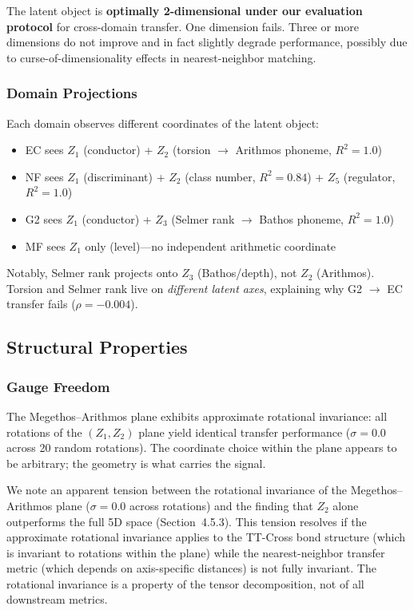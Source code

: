 \documentclass[11pt,a4paper]{article}
\begin{document}
The latent object is \textbf{optimally 2-dimensional under our evaluation protocol} for cross-domain transfer. One dimension fails. Three or more dimensions do not improve and in fact slightly degrade performance, possibly due to curse-of-dimensionality effects in nearest-neighbor matching.

\subsubsection{Domain Projections}

Each domain observes different coordinates of the latent object:
\begin{itemize}[nosep]
    \item EC sees $Z_1$ (conductor) + $Z_2$ (torsion $\to$ Arithmos phoneme, $R^2 = 1.0$)
    \item NF sees $Z_1$ (discriminant) + $Z_2$ (class number, $R^2 = 0.84$) + $Z_5$ (regulator, $R^2 = 1.0$)
    \item G2 sees $Z_1$ (conductor) + $Z_3$ (Selmer rank $\to$ Bathos phoneme, $R^2 = 1.0$)
    \item MF sees $Z_1$ only (level)---no independent arithmetic coordinate
\end{itemize}

Notably, Selmer rank projects onto $Z_3$ (Bathos/depth), not $Z_2$ (Arithmos). Torsion and Selmer rank live on \emph{different latent axes}, explaining why G2 $\to$ EC transfer fails ($\rho = -0.004$).

\subsection{Structural Properties}

\subsubsection{Gauge Freedom}

The Megethos--Arithmos plane exhibits approximate rotational invariance: all rotations of the $(Z_1, Z_2)$ plane yield identical transfer performance ($\sigma = 0.0$ across 20 random rotations). The coordinate choice within the plane appears to be arbitrary; the geometry is what carries the signal.

We note an apparent tension between the rotational invariance of the Megethos--Arithmos plane ($\sigma = 0.0$ across rotations) and the finding that $Z_2$ alone outperforms the full 5D space (Section~4.5.3). This tension resolves if the approximate rotational invariance applies to the TT-Cross bond structure (which is invariant to rotations within the plane) while the nearest-neighbor transfer metric (which depends on axis-specific distances) is not fully invariant. The rotational invariance is a property of the tensor decomposition, not of all downstream metrics.
\end{document}
